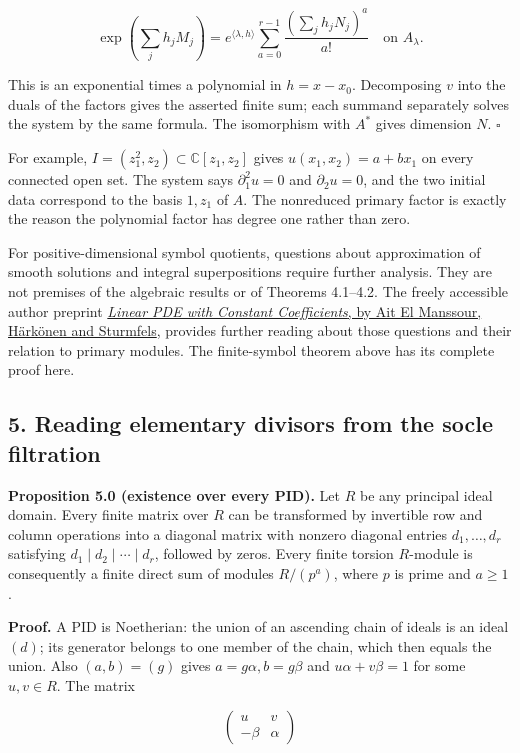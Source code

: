 \documentclass[
]{article}
\begin{document}
\[
\exp\left(\sum_j h_jM_j\right)
=e^{\langle\lambda,h\rangle}
\sum_{a=0}^{r-1}\frac{(\sum_jh_jN_j)^a}{a!}
\quad\text{on }A_\lambda.
\]

This is an exponential times a polynomial in \(h=x-x_0\). Decomposing
\(v\) into the duals of the factors gives the asserted finite sum; each
summand separately solves the system by the same formula. The
isomorphism with \(A^*\) gives dimension \(N\). \(\square\)

For example, \(I=(z_1^2,z_2)\subset\mathbb C[z_1,z_2]\) gives
\(u(x_1,x_2)=a+bx_1\) on every connected open set. The system says
\(\partial_1^2u=0\) and \(\partial_2u=0\), and the two initial data
correspond to the basis \(1,z_1\) of \(A\). The nonreduced primary
factor is exactly the reason the polynomial factor has degree one rather
than zero.

For positive-dimensional symbol quotients, questions about approximation
of smooth solutions and integral superpositions require further
analysis. They are not premises of the algebraic results or of Theorems
4.1--4.2. The freely accessible author preprint
\href{https://arxiv.org/abs/2104.10146}{\emph{Linear PDE with Constant
Coefficients}, by Ait El Manssour, Härkönen and Sturmfels}, provides
further reading about those questions and their relation to primary
modules. The finite-symbol theorem above has its complete proof here.

\subsection{5. Reading elementary divisors from the socle
filtration}\label{reading-elementary-divisors-from-the-socle-filtration}

\textbf{Proposition 5.0 (existence over every PID).} Let \(R\) be any
principal ideal domain. Every finite matrix over \(R\) can be
transformed by invertible row and column operations into a diagonal
matrix with nonzero diagonal entries \(d_1,\ldots,d_r\) satisfying
\(d_1\mid d_2\mid\cdots\mid d_r\), followed by zeros. Every finite
torsion \(R\)-module is consequently a finite direct sum of modules
\(R/(p^a)\), where \(p\) is prime and \(a\ge1\).

\textbf{Proof.} A PID is Noetherian: the union of an ascending chain of
ideals is an ideal \((d)\); its generator belongs to one member of the
chain, which then equals the union. Also \((a,b)=(g)\) gives
\(a=g\alpha,b=g\beta\) and \(u\alpha+v\beta=1\) for some \(u,v\in R\).
The matrix

\[
\begin{pmatrix}u&v\\-\beta&\alpha\end{pmatrix}
\]
\end{document}
